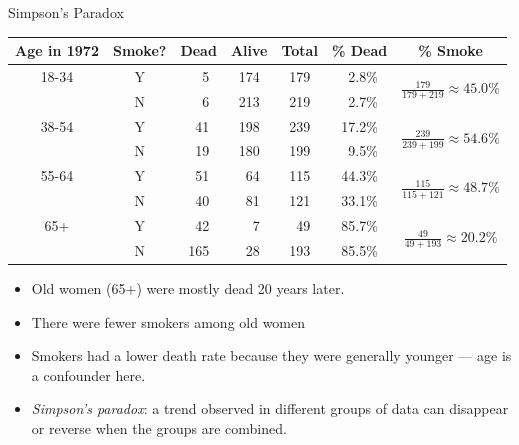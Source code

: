 \documentclass[
  ignorenonframetext,
]{beamer}
\providecommand{\tightlist}{%
  \setlength{\itemsep}{0pt}\setlength{\parskip}{0pt}}
\newcommand{\hl}[1]{\textit{\textcolor{hlblue}{#1}}}
\begin{document}
\begin{frame}{Simpson's Paradox}
\protect\hypertarget{simpsons-paradox-1}{}
\vspace{-12pt}\begin{center}\small\tabcolsep=5pt
\begin{tabular}{@{}ccccccc@{}}
Age in 1972  & Smoke? & Dead & Alive & Total & \% Dead & \% Smoke \\\hline
18-34 & Y & ~~5 & 174 & 179 & ~2.8\% & \multirow{ 2}{*}{$\frac{179}{179+219}\approx45.0\%$}\\
      & N & ~~6 & 213 & 219 & ~2.7\%\\\hline
38-54 & Y & ~41 & 198 & 239 & 17.2\% & \multirow{ 2}{*}{$\frac{239}{239+199}\approx54.6\%$}\\
      & N & ~19 & 180 & 199 & ~9.5\%\\\hline
55-64 & Y & ~51 & ~64 & 115 & 44.3\% & \multirow{ 2}{*}{$\frac{115}{115+121}\approx48.7\%$}\\
      & N & ~40 & ~81 & 121 & 33.1\%\\\hline
65+   & Y & ~42 & ~~7 & ~49 & 85.7\% & \multirow{ 2}{*}{$\frac{49}{49+193}\approx20.2\%$}\\
      & N & 165 & ~28 & 193 & 85.5\%\\\hline
\end{tabular}
\end{center}

\begin{itemize}[<+->]
\tightlist
\item
  Old women (65+) were mostly dead 20 years later.
\item
  There were fewer smokers among old women
\item
  Smokers had a lower death rate because they were generally younger ---
  age is a confounder here.
\item
  \hl{Simpson's paradox}: a trend observed in different groups of data
  can disappear or reverse when the groups are combined.
\end{itemize}
\end{frame}
\end{document}
